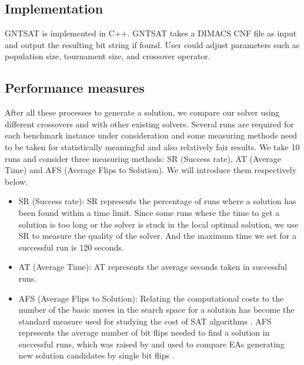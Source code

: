\subsection{Implementation}
GNTSAT is implemented in C++. GNTSAT takes a DIMACS CNF file as input and
output the resulting bit string if found. User could adjust parameters such as
population size, tournament size, and crossover operator.

\subsection{Performance measures}
After all these processes to generate a solution, we compare our solver using
different crossovers and with other existing solvers. Several runs are
required for each benchmark instance under consideration and some measuring
methods need to be taken for statistically meaningful and also relatively fair
results. We take 10 runs and consider three measuring methods: SR (Success
rate), AT (Average Time) and AFS (Average Flips to Solution). We will
introduce them respectively below.

\begin{itemize}
	\item
	      SR (Success rate): SR represents the percentage of runs where a solution has
	      been found within a time limit. Since some runs where the time to get a
	      solution is too long or the solver is stuck in the local optimal solution, we
	      use SR to measure the quality of the solver. And the maximum time we set for a
	      successful run is 120 seconds.
	\item
	      AT (Average Time): AT represents the average seconds taken in successful runs.
	\item
	      AFS (Average Flips to Solution): Relating the computational costs to the
	      number of the basic moves in the search space for a solution has become the
	      standard measure used for studying the cost of SAT algorithms
	      \parencite{Singer2000}. AFS represents the average number of bit flips needed
	      to find a solution in successful runs, which was raised by
	      \citeauthor{Voss} and used to compare EAs generating new solution
	      candidates by single bit flips \parencite{Voss}.
\end{itemize}
